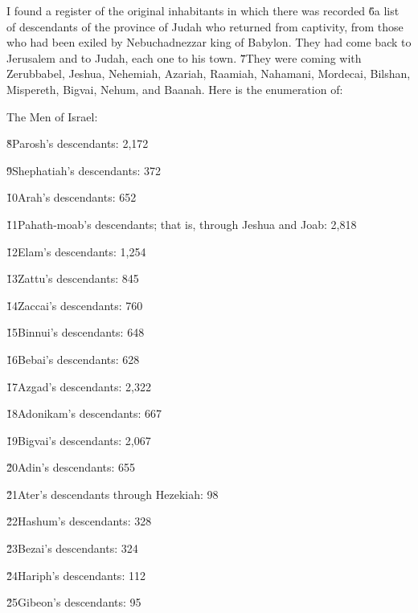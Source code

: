 I found a register of the original inhabitants in which there was recorded \v{6}a list of descendants of the province of Judah who returned from captivity, from those who had been exiled by Nebuchadnezzar king of Babylon. They had come back to Jerusalem and to Judah, each one to his town. \v{7}They were coming with Zerubbabel, Jeshua, Nehemiah, Azariah, Raamiah, Nahamani, Mordecai, Bilshan, Mispereth, Bigvai, Nehum, and Baanah. Here is the enumeration of:

The Men of Israel:

\v{8}Parosh's descendants: 2,172

\v{9}Shephatiah's descendants: 372

\v{10}Arah's descendants: 652

\v{11}Pahath-moab's descendants; that is, through Jeshua and Joab: 2,818

\v{12}Elam's descendants: 1,254

\v{13}Zattu's descendants: 845

\v{14}Zaccai's descendants: 760

\v{15}Binnui's descendants: 648

\v{16}Bebai's descendants: 628

\v{17}Azgad's descendants: 2,322

\v{18}Adonikam's descendants: 667

\v{19}Bigvai's descendants: 2,067

\v{20}Adin's descendants: 655

\v{21}Ater's descendants through Hezekiah: 98

\v{22}Hashum's descendants: 328

\v{23}Bezai's descendants: 324

\v{24}Hariph's descendants: 112

\v{25}Gibeon's descendants: 95

